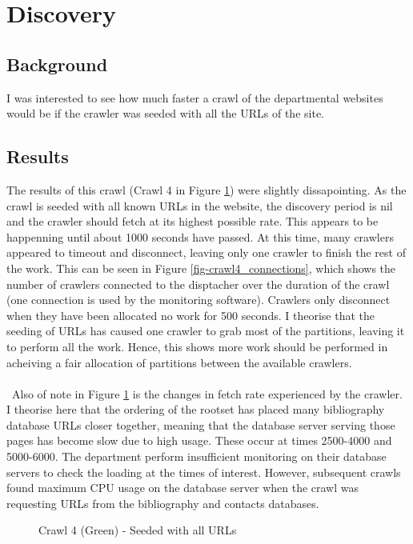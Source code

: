 \section{Discovery}
\subsection{Background}
I was interested to see how much faster a crawl of the departmental websites would be if the crawler was seeded with all the URLs of the site. 
\subsection{Results}
The results of this crawl (Crawl 4 in Figure \ref{fig-crawl4}) were slightly dissapointing. As the crawl is seeded with all known URLs in the website, the discovery period is nil and the crawler should fetch at its highest possible rate. This appears to be happenning until about 1000 seconds have passed. At this time, many crawlers appeared to timeout and disconnect, leaving only one crawler to finish the rest of the work. This can be seen in Figure \ref{fig-crawl4_connections}, which shows the number of crawlers connected to the disptacher over the duration of the crawl (one connection is used by the monitoring software). Crawlers only disconnect when they have been allocated no work for 500 seconds. I theorise that the seeding of URLs has caused one crawler to grab most of the partitions, leaving it to perform all the work. Hence, this shows more work should be performed in acheiving a fair allocation of partitions between the available crawlers.\\
\\ \
Also of note in Figure \ref{fig-crawl4} is the changes in fetch rate experienced by the crawler. I theorise here that the ordering of the rootset has placed many bibliography database URLs closer together, meaning that the database server serving those pages has become slow due to high usage. These occur at times 2500-4000 and 5000-6000. The department perform insufficient monitoring on their database servers to check the loading at the times of interest. However, subsequent crawls found maximum CPU usage on the database server when the crawl was requesting URLs from the bibliography and contacts databases.
\begin{figure}[h]
  \centerline{
   }
\label{fig-crawl4}
\caption{Crawl 4 (Green) - Seeded with all URLs}
\end{figure}

